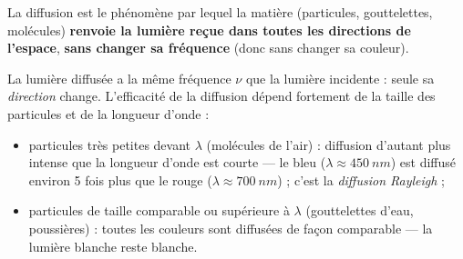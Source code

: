 \documentclass[11pt]{article}
\newcommand{\cle}[1]{{\popxbold\color{popdark}#1}}
\begin{document}
\begin{definition}
La \cle{diffusion} est le phénomène par lequel la matière (particules, gouttelettes, molécules) \textbf{renvoie la lumière reçue dans toutes les directions de l'espace}, \textbf{sans changer sa fréquence} (donc sans changer sa couleur).

La lumière diffusée a la même fréquence $\nu$ que la lumière incidente : seule sa \emph{direction} change. L'efficacité de la diffusion dépend fortement de la taille des particules et de la longueur d'onde :
\begin{itemize}
\item particules très petites devant $\lambda$ (molécules de l'air) : diffusion d'autant plus intense que la longueur d'onde est courte — le bleu ($\lambda \approx \SI{450}{nm}$) est diffusé environ 5 fois plus que le rouge ($\lambda \approx \SI{700}{nm}$) ; c'est la \emph{diffusion Rayleigh} ;
\item particules de taille comparable ou supérieure à $\lambda$ (gouttelettes d'eau, poussières) : toutes les couleurs sont diffusées de façon comparable — la lumière blanche reste blanche.
\end{itemize}
\end{definition}
\end{document}
